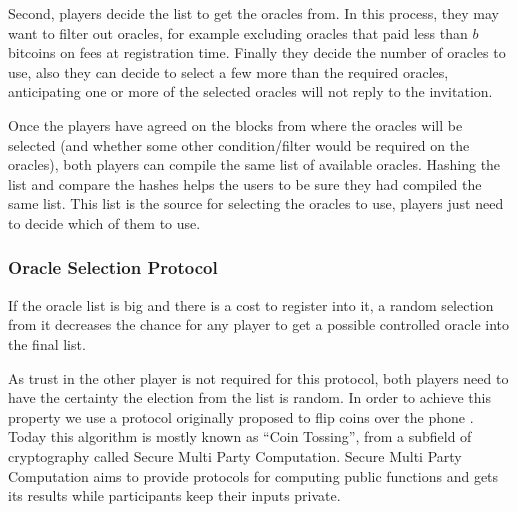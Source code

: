 Second, players decide the list to get the oracles from.
In this process, they may want to filter out oracles, for example excluding
  oracles that paid less than $b$ bitcoins on fees at registration time.
Finally they decide the number of oracles to use, also they can decide to
  select a few more than the required oracles, anticipating one or more of
  the selected oracles will not reply to the invitation.

Once the players have agreed on the blocks from where the oracles will be
  selected (and whether some other condition/filter would be required on the
  oracles), both players can compile the same list of available oracles.
Hashing the list and compare the hashes helps the users to be sure they had
  compiled the same list.
This list is the source for selecting the oracles to use, players just need to
  decide which of them to use.

\subsubsection{Oracle Selection Protocol}

If the oracle list is big and there is a cost to register into it, a random
  selection from it decreases the chance for any player to get a possible
  controlled oracle into the final list.

As trust in the other player is not required for this protocol, both players
need to have the certainty the election from the list is random.
In order to achieve this property we use a protocol originally proposed to flip
  coins over the phone \cite{blum1983coin}.
Today this algorithm is mostly known as ``Coin Tossing'', from a subfield of
  cryptography called Secure Multi Party Computation.
Secure Multi Party Computation aims to provide protocols for computing public
  functions and gets its results while participants keep their inputs private.

